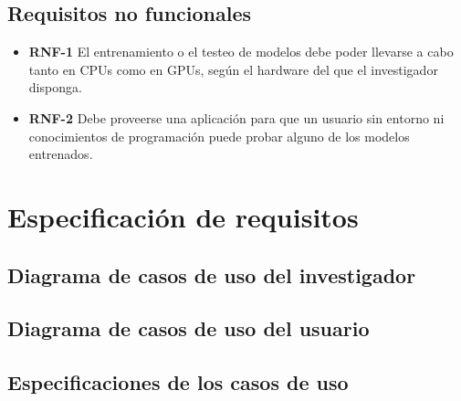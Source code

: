 \subsection{Requisitos no funcionales}

\begin{itemize}
    \item \textbf{RNF-1} El entrenamiento o el testeo de modelos debe poder llevarse a cabo tanto en CPUs como en GPUs, según el hardware del que el investigador disponga.
    \item \textbf{RNF-2} Debe proveerse una aplicación para que un usuario sin entorno ni conocimientos de programación puede probar alguno de los modelos entrenados.
\end{itemize}

\section{Especificación de requisitos}


\subsection{Diagrama de casos de uso del investigador}


\subsection{Diagrama de casos de uso del usuario}


\subsection{Especificaciones de los casos de uso}

